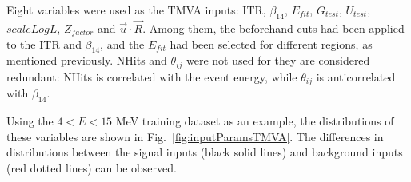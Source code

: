 Eight variables were used as the TMVA inputs: ITR, $\beta_{14}$, $E_{fit}$, $G_{test}$, $U_{test}$, $scaleLogL$, $Z_{factor}$ and $\vec{u}\cdot \vec{R}$. Among them, the beforehand cuts had been applied to the ITR and $\beta_{14}$, and the $E_{fit}$ had been selected for different regions, as mentioned previously. NHits and $\theta_{ij}$ were not used for they are considered redundant: NHits is correlated with the event energy, while $\theta_{ij}$ is anticorrelated with $\beta_{14}$.

Using the $4<E<15$ MeV training dataset as an example, the distributions of these variables are shown in Fig.~\ref{fig:inputParamsTMVA}. The differences in distributions between the signal inputs (black solid lines) and background inputs (red dotted lines) can be observed.

\begin{figure}[htbp]
	\centering
\end{figure}
